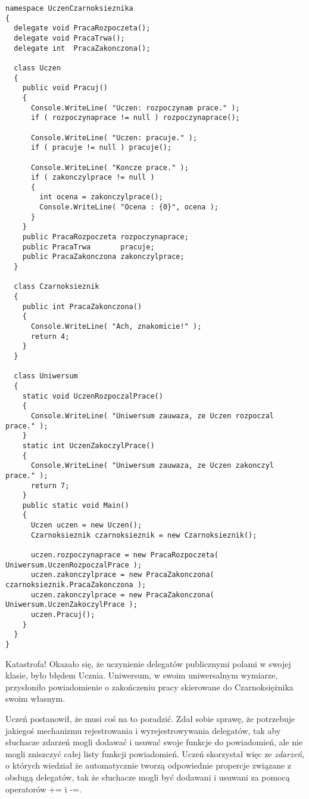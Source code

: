 {\begin{scriptsize}
\begin{verbatim}
namespace UczenCzarnoksieznika
{	
  delegate void PracaRozpoczeta();
  delegate void PracaTrwa();
  delegate int  PracaZakonczona();
  
  class Uczen
  {
    public void Pracuj()
    {
      Console.WriteLine( "Uczen: rozpoczynam prace." );
      if ( rozpoczynaprace != null ) rozpoczynaprace();
  		
      Console.WriteLine( "Uczen: pracuje." );
      if ( pracuje != null ) pracuje();
  	  
      Console.WriteLine( "Koncze prace." );
      if ( zakonczylprace != null ) 
      {
        int ocena = zakonczylprace();
        Console.WriteLine( "Ocena : {0}", ocena );
      }
    }
    public PracaRozpoczeta rozpoczynaprace;
    public PracaTrwa       pracuje;
    public PracaZakonczona zakonczylprace;
  }
  
  class Czarnoksieznik 
  {
    public int PracaZakonczona() 
    {
      Console.WriteLine( "Ach, znakomicie!" );
      return 4;
    }
  }
  
  class Uniwersum
  {  	
    static void UczenRozpoczalPrace()
    {
      Console.WriteLine( "Uniwersum zauwaza, ze Uczen rozpoczal prace." );      
    }
    static int UczenZakoczylPrace()
    {
      Console.WriteLine( "Uniwersum zauwaza, ze Uczen zakonczyl prace." );      
      return 7;
    }
    public static void Main()
    {
      Uczen uczen = new Uczen();
      Czarnoksieznik czarnoksieznik = new Czarnoksieznik();
  		
      uczen.rozpoczynaprace = new PracaRozpoczeta( Uniwersum.UczenRozpoczalPrace );    	
      uczen.zakonczylprace = new PracaZakonczona( czarnoksieznik.PracaZakonczona );  		
      uczen.zakonczylprace = new PracaZakonczona( Uniwersum.UczenZakoczylPrace );    	
      uczen.Pracuj();
    }
  }
}
\end{verbatim}
\end{scriptsize}

Katastrofa! Okazało się, że uczynienie delegatów publicznymi polami w swojej klasie, było błędem Ucznia. 
Uniwersum, w swoim uniwersalnym wymiarze, przysłoniło powiadomienie o zakończeniu pracy skierowane 
do Czarnoksiężnika swoim własnym. 

Uczeń postanowił, że musi coś na to poradzić. Zdał sobie sprawę, że potrzebuje jakiegoś
mechanizmu rejestrowania i wyrejestrowywania delegatów, tak aby słuchacze zdarzeń mogli 
dodawać i usuwać swoje funkcje do powiadomień, ale nie mogli zniszczyć całej listy funkcji powiadomień.
Uczeń skorzystał więc ze {\em zdarzeń}, o których wiedział że automatycznie tworzą odpowiednie propercje
związane z obsługą delegatów, tak że słuchacze mogli być dodawani i usuwani za pomocą operatorów
+= i -=.

}
